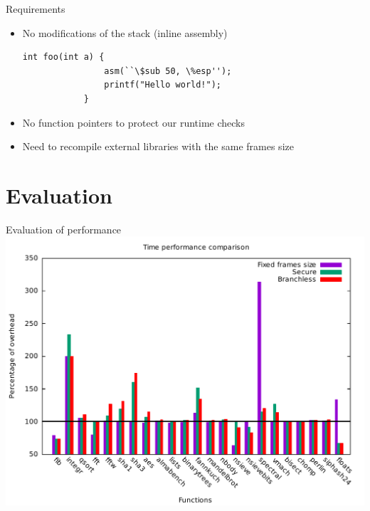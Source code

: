 \documentclass{beamer}
\begin{document}
\begin{frame}[fragile]{Requirements}
	\begin{itemize}
		\item No modifications of the stack (inline assembly)
			\begin{lstlisting}[tabsize=2,frame=single,linewidth=7cm]
			int foo(int a) {
				asm(``\$sub 50, \%esp'');
				printf("Hello world!");
			}
			\end{lstlisting}
		\item No function pointers to protect our runtime checks
		\item Need to recompile external libraries with the same frames size
	\end{itemize}
\end{frame}

\section{Evaluation}
\label{sec:Implementation}

\begin{frame}[c]{Evaluation of performance }
	\includegraphics[width=\textwidth]{images/time_percentage_graph.pdf}
\end{frame}
\end{document}
